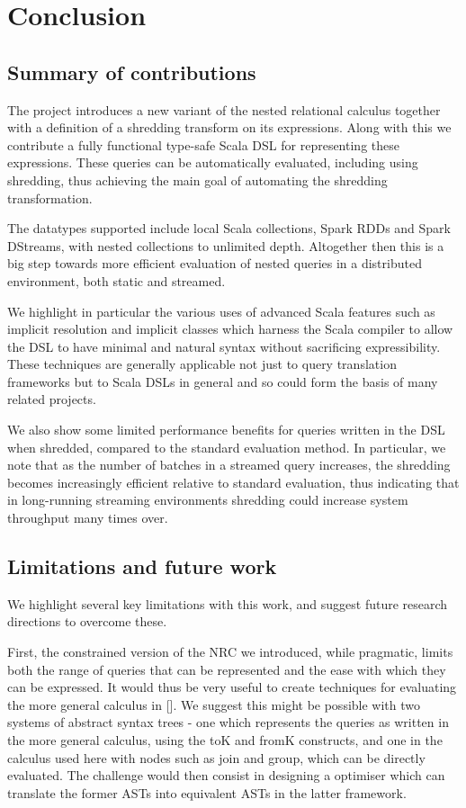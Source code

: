 \chapter{Conclusion}

\section{Summary of contributions}

The project introduces a new variant of the nested relational calculus together with a definition of a shredding transform on its expressions. Along with this we contribute a fully functional type-safe Scala DSL for representing these expressions. These queries can be automatically evaluated, including using shredding, thus achieving the main goal of automating the shredding transformation.

The datatypes supported include local Scala collections, Spark RDDs and Spark DStreams, with nested collections to unlimited depth. Altogether then this is a big step towards more efficient evaluation of nested queries in a distributed environment, both static and streamed.

We highlight in particular the various uses of advanced Scala features such as implicit resolution and implicit classes which harness the Scala compiler to allow the DSL to have minimal and natural syntax without sacrificing expressibility. These techniques are generally applicable not just to query translation frameworks but to Scala DSLs in general and so could form the basis of many related projects.

We also show some limited performance benefits for queries written in the DSL when shredded, compared to the standard evaluation method. In particular, we note that as the number of batches in a streamed query increases, the shredding becomes increasingly efficient relative to standard evaluation, thus indicating that in long-running streaming environments shredding could increase system throughput many times over.

\section{Limitations and future work}

We highlight several key limitations with this work, and suggest future research directions to overcome these.

First, the constrained version of the NRC we introduced, while pragmatic, limits both the range of queries that can be represented and the ease with which they can be expressed.  It would thus be very useful to create techniques for evaluating the more general calculus in []. We suggest this might be possible with two systems of abstract syntax trees - one which represents the queries as written in the more general calculus, using the toK and fromK constructs, and one in the calculus used here with nodes such as join and group, which can be directly evaluated. The challenge would then consist in designing a optimiser which can translate the former ASTs into equivalent ASTs in the latter framework.

